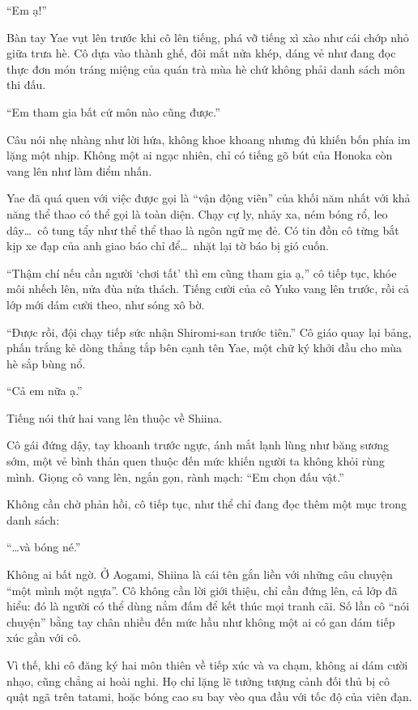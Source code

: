 \documentclass[../main.tex]{subfiles}
\begin{document}
``Em ạ!''

Bàn tay Yae vụt lên trước khi cô lên tiếng, phá vỡ tiếng xì xào như cái chớp nhỏ giữa trưa hè. Cô dựa vào thành ghế, đôi mắt nửa khép, dáng vẻ như đang đọc thực đơn món tráng miệng của quán trà mùa hè chứ không phải danh sách môn thi đấu.

``Em tham gia bất cứ môn nào cũng được.''

Câu nói nhẹ nhàng như lời hứa, không khoe khoang nhưng đủ khiến bốn phía im lặng một nhịp. Không một ai ngạc nhiên, chỉ có tiếng gõ bút của Honoka còn vang lên như làm điểm nhấn.

Yae đã quá quen với việc được gọi là ``vận động viên'' của khối năm nhất với khả năng thể thao có thể gọi là toàn diện. Chạy cự ly, nhảy xa, ném bóng rổ, leo dây\dots\ cô tung tẩy như thể thể thao là ngôn ngữ mẹ đẻ. Có tin đồn cô từng bắt kịp xe đạp của anh giao báo chỉ để\dots\ nhặt lại tờ báo bị gió cuốn.

``Thậm chí nếu cần người `chơi tất' thì em cũng tham gia ạ,'' cô tiếp tục, khóe môi nhếch lên, nửa đùa nửa thách. Tiếng cười của cô Yuko vang lên trước, rồi cả lớp mới dám cười theo, như sóng xô bờ.

``Được rồi, đội chạy tiếp sức nhận Shiromi-san trước tiên.'' Cô giáo quay lại bảng, phấn trắng kẻ dòng thẳng tắp bên cạnh tên Yae, một chữ ký khởi đầu cho mùa hè sắp bùng nổ.

``Cả em nữa ạ.''

Tiếng nói thứ hai vang lên thuộc về Shiina.

Cô gái đứng dậy, tay khoanh trước ngực, ánh mắt lạnh lùng như băng sương sớm, một vẻ bình thản quen thuộc đến mức khiến người ta không khỏi rùng mình. Giọng cô vang lên, ngắn gọn, rành mạch: ``Em chọn đấu vật.''

Không cần chờ phản hồi, cô tiếp tục, như thể chỉ đang đọc thêm một mục trong danh sách:

``\dots và bóng né.''

Không ai bất ngờ. Ở Aogami, Shiina là cái tên gắn liền với những câu chuyện ``một mình một ngựa''. Cô không cần lời giới thiệu, chỉ cần đứng lên, cả lớp đã hiểu: đó là người có thể dùng nắm đấm để kết thúc mọi tranh cãi. Số lần cô ``nói chuyện'' bằng tay chân nhiều đến mức hầu như không một ai có gan dám tiếp xúc gần với cô.

Vì thế, khi cô đăng ký hai môn thiên về tiếp xúc và va chạm, không ai dám cười nhạo, cũng chẳng ai hoài nghi. Họ chỉ lặng lẽ tưởng tượng cảnh đối thủ bị cô quật ngã trên tatami, hoặc bóng cao su bay vèo qua đầu với tốc độ của viên đạn.
\end{document}
